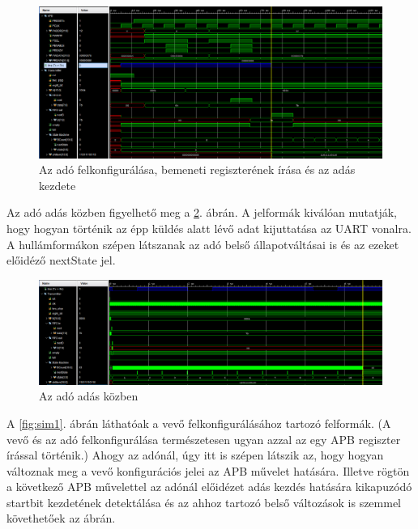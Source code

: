 \begin{figure}[h]
	\vspace{0.5cm}
	\begin{center}
		\includegraphics[width=\textwidth]{figures/sim4.png}
		\caption{Az adó felkonfigurálása, bemeneti regiszterének írása és az adás kezdete}
		\label{fig:sim4}
	\end{center}
	\vspace{0.5cm}
\end{figure}


Az adó adás közben figyelhető meg a \ref{fig:sim5}. ábrán. A jelformák kiválóan mutatják, hogy hogyan történik az épp küldés alatt lévő adat kijuttatása az UART vonalra.
A hullámformákon szépen látszanak az adó belső állapotváltásai is és az ezeket előidéző nextState jel.


\begin{figure}[h]
	\vspace{0.5cm}
	\begin{center}
		\includegraphics[width=\textwidth]{figures/sim5.png}
		\caption{Az adó adás közben}
		\label{fig:sim5}
	\end{center}
	\vspace{0.5cm}
\end{figure}


A \ref{fig:sim1}. ábrán láthatóak a vevő felkonfigurálásához tartozó felformák. (A vevő és az adó felkonfigurálása természetesen ugyan azzal az egy APB regiszter írással történik.)
Ahogy az adónál, úgy itt is szépen látszik az, hogy hogyan változnak meg a vevő konfigurációs jelei az APB művelet hatására.
Illetve rögtön a következő APB művelettel az adónál előidézet adás kezdés hatására kikapuzódó startbit kezdetének detektálása és az ahhoz tartozó belső változások is szemmel követhetőek az ábrán.


